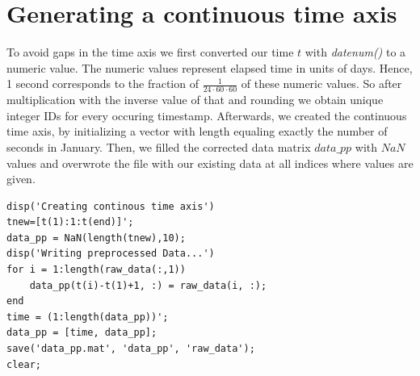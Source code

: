 \documentclass[10pt]{article}
\begin{document}
\section{Generating a continuous time axis}
To avoid gaps in the time axis we first converted our time $t$ with \textit{datenum()} to a numeric value. The numeric values represent elapsed time in units of days. Hence, 1 second corresponds to the fraction of  $\frac{1}{24\cdot60\cdot60}$ of these numeric values. So after multiplication with the inverse value of that and rounding we obtain unique integer IDs for every occuring timestamp. 
Afterwards, we created the continuous time axis, by initializing a vector with length equaling exactly the number of seconds in January. 
Then, we filled the corrected data matrix $data\_pp$ with $NaN$ values and overwrote the file with our existing data at all indices where values are given.\\
\begin{lstlisting}
disp('Creating continous time axis')
tnew=[t(1):1:t(end)]';
data_pp = NaN(length(tnew),10);
disp('Writing preprocessed Data...')
for i = 1:length(raw_data(:,1))
    data_pp(t(i)-t(1)+1, :) = raw_data(i, :);
end
time = (1:length(data_pp))';
data_pp = [time, data_pp];
save('data_pp.mat', 'data_pp', 'raw_data');
clear;
\end{lstlisting}
\end{document}
